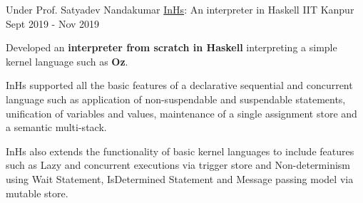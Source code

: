 \begin{cventries}


  \cventry
    {Under Prof. Satyadev Nandakumar} %
    {\href{https://github.com/ayush268/InHs}{InHs}: An interpreter in Haskell} %
    {IIT Kanpur} %
    {Sept 2019 - Nov 2019} %
    {
      \begin{cvitems} %
      \item {Developed an \textbf{interpreter from scratch in Haskell} interpreting a simple kernel language such as \textbf{Oz}.}
      \item {InHs supported all the basic features of a declarative sequential and concurrent language such as application of non-suspendable and suspendable statements, unification of variables and values, maintenance of a single assignment store and a semantic multi-stack.}
      \item {InHs also extends the functionality of basic kernel languages to include features such as Lazy and concurrent executions via trigger store and Non-determinism using Wait Statement, IsDetermined Statement and Message passing model via mutable store.}
      \end{cvitems}
    }%


\end{cventries}

